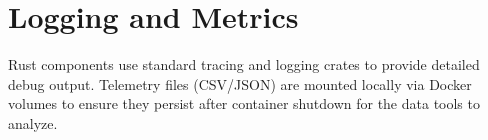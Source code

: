 \section{Logging and Metrics}
\label{sec:logging_and_metrics}
Rust components use standard tracing and logging crates to provide detailed debug output. Telemetry files (CSV/JSON) are mounted locally via Docker volumes to ensure they persist after container shutdown for the data tools to analyze.